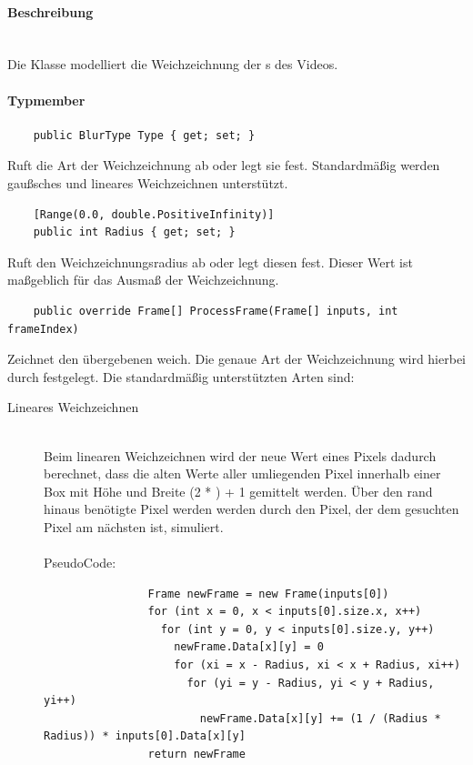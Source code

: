 \paragraph{Beschreibung}~\\
Die Klasse  modelliert die Weichzeichnung der s des Videos.

\paragraph{Typmember}
\begin{itemize}

	\begin{verbatim}
	public BlurType Type { get; set; }
	\end{verbatim}
	Ruft die Art der Weichzeichnung ab oder legt sie fest. Standardmäßig werden gaußsches und lineares Weichzeichnen unterstützt.
	
	\begin{verbatim}
	[Range(0.0, double.PositiveInfinity)]
	public int Radius { get; set; }
	\end{verbatim}
	Ruft den Weichzeichnungsradius ab oder legt diesen fest. Dieser Wert ist maßgeblich für das Ausmaß der Weichzeichnung.

	\begin{verbatim}
	public override Frame[] ProcessFrame(Frame[] inputs, int frameIndex)
	\end{verbatim}
	Zeichnet den übergebenen  weich. Die genaue Art der Weichzeichnung wird hierbei durch  festgelegt. Die standardmäßig unterstützten Arten sind:
	\begin{description}
		\item[Lineares Weichzeichnen]~\\
			Beim linearen Weichzeichnen wird der neue Wert eines Pixels dadurch berechnet, dass die alten Werte aller umliegenden Pixel innerhalb einer Box mit Höhe und Breite (2 * ) + 1 gemittelt werden. Über den rand hinaus benötigte Pixel werden werden durch den Pixel, der dem gesuchten Pixel am nächsten ist, simuliert. ~\\~\\
			PseudoCode:
			\begin{verbatim}
				Frame newFrame = new Frame(inputs[0])
				for (int x = 0, x < inputs[0].size.x, x++)
				  for (int y = 0, y < inputs[0].size.y, y++)
				    newFrame.Data[x][y] = 0
				    for (xi = x - Radius, xi < x + Radius, xi++)
				      for (yi = y - Radius, yi < y + Radius, yi++)
				        newFrame.Data[x][y] += (1 / (Radius * Radius)) * inputs[0].Data[x][y]
				return newFrame
				

\end{verbatim}
\end{description}
\end{itemize}
